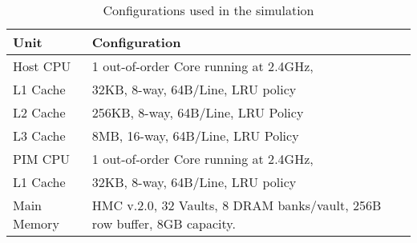 %    
%
%
%
%
%
%
\begin{table}[t!]
\small
\caption{Configurations used in the simulation }
    \begin{tabularx}{\columnwidth}{lXr}
\toprule
Unit & Configuration  \\
\midrule
Host CPU & 1 out-of-order Core running at 2.4GHz,   \\
L1 Cache & 32KB, 8-way, 64B/Line, LRU policy \\
L2 Cache & 256KB, 8-way, 64B/Line, LRU Policy \\
L3 Cache & 8MB, 16-way, 64B/Line, LRU Policy  \\
\midrule
PIM CPU & 1 out-of-order Core running at 2.4GHz,   \\
L1 Cache & 32KB, 8-way, 64B/Line, LRU policy \\
\midrule
Main Memory & HMC v.2.0, 32 Vaults, 8 DRAM banks/vault, 256B row buffer, 8GB capacity.\\


\bottomrule
  \end{tabularx}
\label{table:hostarch}
\end{table}
